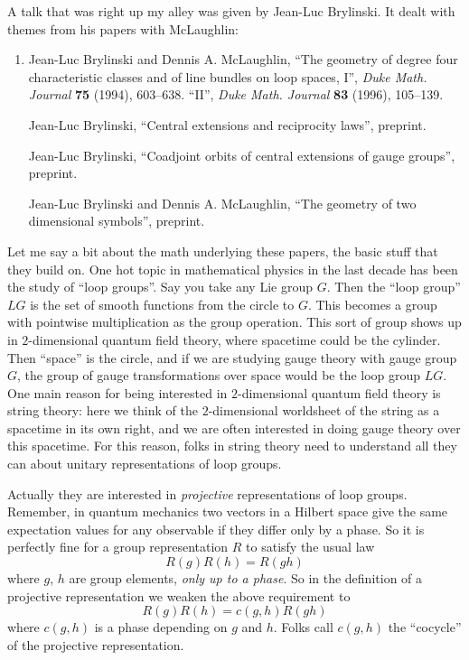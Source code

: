 \documentclass{article}
\begin{document}
A talk that was right up my alley was given by Jean-Luc Brylinski. It
dealt with themes from his papers with McLaughlin:

\begin{enumerate}
\def\labelenumi{\arabic{enumi})}
\setcounter{enumi}{1}
\item
  Jean-Luc Brylinski and Dennis A. McLaughlin, ``The geometry of degree
  four characteristic classes and of line bundles on loop spaces, I'',
  \emph{Duke Math. Journal} \textbf{75} (1994), 603--638. ``II'',
  \emph{Duke Math. Journal} \textbf{83} (1996), 105--139.

  Jean-Luc Brylinski, ``Central extensions and reciprocity laws'',
  preprint.

  Jean-Luc Brylinski, ``Coadjoint orbits of central extensions of gauge
  groups'', preprint.

  Jean-Luc Brylinski and Dennis A. McLaughlin, ``The geometry of two
  dimensional symbols'', preprint.
\end{enumerate}

Let me say a bit about the math underlying these papers, the basic stuff
that they build on. One hot topic in mathematical physics in the last
decade has been the study of ``loop groups''. Say you take any Lie group
\(G\). Then the ``loop group'' \(LG\) is the set of smooth functions
from the circle to \(G\). This becomes a group with pointwise
multiplication as the group operation. This sort of group shows up in
\(2\)-dimensional quantum field theory, where spacetime could be the
cylinder. Then ``space'' is the circle, and if we are studying gauge
theory with gauge group \(G\), the group of gauge transformations over
space would be the loop group \(LG\). One main reason for being
interested in \(2\)-dimensional quantum field theory is string theory:
here we think of the \(2\)-dimensional worldsheet of the string as a
spacetime in its own right, and we are often interested in doing gauge
theory over this spacetime. For this reason, folks in string theory need
to understand all they can about unitary representations of loop groups.

Actually they are interested in \emph{projective} representations of
loop groups. Remember, in quantum mechanics two vectors in a Hilbert
space give the same expectation values for any observable if they differ
only by a phase. So it is perfectly fine for a group representation
\(R\) to satisfy the usual law \[R(g)R(h) = R(gh)\] where \(g\), \(h\)
are group elements, \emph{only up to a phase}. So in the definition of a
projective representation we weaken the above requirement to
\[R(g) R(h) = c(g,h) R(gh)\] where \(c(g,h)\) is a phase depending on
\(g\) and \(h\). Folks call \(c(g,h)\) the ``cocycle'' of the projective
representation.
\end{document}
